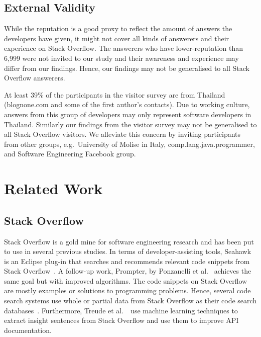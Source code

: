 \documentclass{svjour3}                     %
\begin{document}
\subsection{External Validity} 
While the reputation is a good proxy to reflect the amount of answers the
developers have given, it might not cover all kinds of answerers and their
experience on Stack Overflow. The answerers who have lower-reputation than 6,999
were not invited to our study and their awareness and experience may differ from
our findings. Hence, our findings may not be generalised to all Stack Overflow
answerers.

At least 39\% of the participants in the visitor survey are from Thailand
(\textsf{blognone.com} and some of the first author's contacts). Due to working
culture, answers from this group of developers may only represent software
developers in Thailand. Similarly our findings from the visitor survey may not
be generalised to all Stack Overflow visitors. We alleviate this concern by
inviting participants from other groups, e.g.~University of Molise in Italy,
comp.lang.java.programmer, and Software Engineering Facebook group.

\section{Related Work}

\subsection{Stack Overflow}

Stack Overflow is a gold mine for software engineering research and has been put
to use in several previous studies. In terms of developer-assisting tools,
Seahawk is an Eclipse plug-in that searches and recommends relevant code
snippets from Stack Overflow~\citep{Ponzanelli2013}. A follow-up work, Prompter,
by Ponzanelli et al.~\citep{Ponzanelli2014} achieves the same goal but with
improved algorithms. The code snippets on Stack Overflow are mostly examples or
solutions to programming problems. Hence, several code search systems use whole
or partial data from Stack Overflow as their code search
databases~\citep{Keivanloo2014,Park2014,
	Stolee2014,Subramanian2013,Diamantopoulos2015}. Furthermore, Treude et
al.~\cite{Treude2016}~use machine learning techniques to extract insight
sentences from Stack Overflow and use them to improve API documentation.
\end{document}
